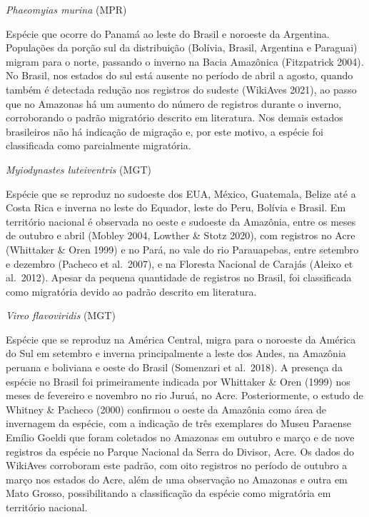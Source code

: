 \documentclass[
  oneside]{scrbook}
\begin{document}
\begin{blackbox}
\emph{Phaeomyias murina} (MPR)

Espécie que ocorre do Panamá ao leste do Brasil e noroeste da Argentina. Populações da porção sul da distribuição (Bolívia, Brasil, Argentina e Paraguai) migram para o norte, passando o inverno na Bacia Amazônica (Fitzpatrick 2004). No Brasil, nos estados do sul está ausente no período de abril a agosto, quando também é detectada redução nos registros do sudeste (WikiAves 2021), ao passo que no Amazonas há um aumento do número de registros durante o inverno, corroborando o padrão migratório descrito em literatura. Nos demais estados brasileiros não há indicação de migração e, por este motivo, a espécie foi classificada como parcialmente migratória.

\end{blackbox}

\begin{blackbox}
\emph{Myiodynastes luteiventris} (MGT)

Espécie que se reproduz no sudoeste dos EUA, México, Guatemala, Belize até a Costa Rica e inverna no leste do Equador, leste do Peru, Bolívia e Brasil. Em território nacional é observada no oeste e sudoeste da Amazônia, entre os meses de outubro e abril (Mobley 2004, Lowther \& Stotz 2020), com registros no Acre (Whittaker \& Oren 1999) e no Pará, no vale do rio Parauapebas, entre setembro e dezembro (Pacheco et al.~2007), e na Floresta Nacional de Carajás (Aleixo et al.~2012). Apesar da pequena quantidade de registros no Brasil, foi classificada como migratória devido ao padrão descrito em literatura.

\end{blackbox}

\begin{blackbox}
\emph{Vireo flavoviridis} (MGT)

Espécie que se reproduz na América Central, migra para o noroeste da América do Sul em setembro e inverna principalmente a leste dos Andes, na Amazônia peruana e boliviana e oeste do Brasil (Somenzari et al.~2018). A presença da espécie no Brasil foi primeiramente indicada por Whittaker \& Oren (1999) nos meses de fevereiro e novembro no rio Juruá, no Acre. Posteriormente, o estudo de Whitney \& Pacheco (2000) confirmou o oeste da Amazônia como área de invernagem da espécie, com a indicação de três exemplares do Museu Paraense Emílio Goeldi que foram coletados no Amazonas em outubro e março e de nove registros da espécie no Parque Nacional da Serra do Divisor, Acre. Os dados do WikiAves corroboram este padrão, com oito registros no período de outubro a março nos estados do Acre, além de uma observação no Amazonas e outra em Mato Grosso, possibilitando a classificação da espécie como migratória em território nacional.

\end{blackbox}
\end{document}
